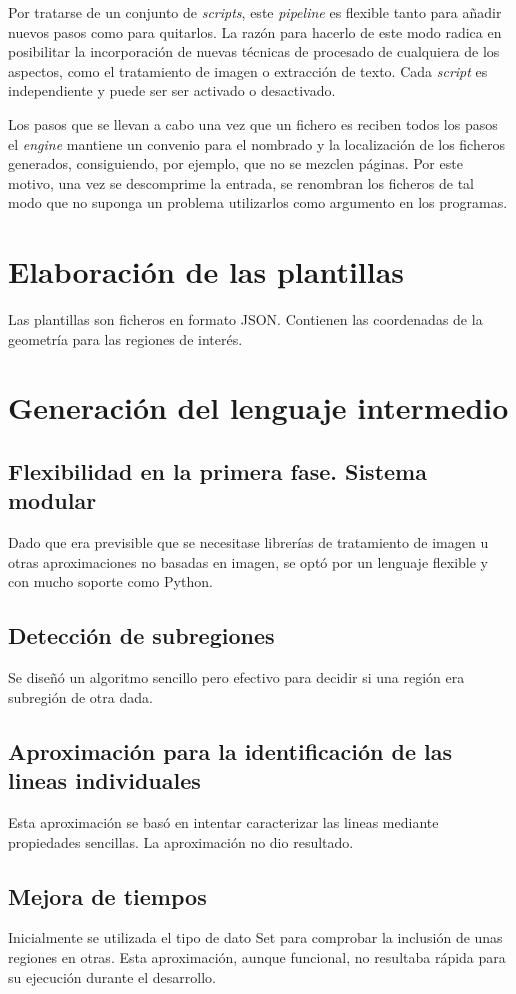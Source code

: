 Por tratarse de un conjunto de \emph{scripts}, este \emph{pipeline} es flexible tanto para añadir nuevos pasos como para quitarlos. La razón para hacerlo de este modo radica en posibilitar la incorporación de nuevas técnicas de procesado de cualquiera de los aspectos, como el tratamiento de imagen o extracción de texto. Cada \emph{script} es independiente y puede ser ser activado o desactivado.


Los pasos que se llevan a cabo una vez que un fichero es reciben todos los pasos el \emph{engine} mantiene un convenio para el nombrado y la localización de los ficheros generados, consiguiendo, por ejemplo, que no se mezclen páginas. Por este motivo, una vez se descomprime la entrada, se renombran los ficheros de tal modo que no suponga un problema utilizarlos como argumento en los programas.

\section{Elaboración de las plantillas}
Las plantillas son ficheros en formato JSON. Contienen las coordenadas de la geometría para las regiones de interés.
\section{Generación del lenguaje intermedio}
\subsection{Flexibilidad en la primera fase. Sistema modular}
Dado que era previsible que se necesitase librerías de tratamiento de imagen u otras aproximaciones no basadas en imagen, se optó por un lenguaje flexible y con mucho soporte como Python.
\subsection{Detección de subregiones}
Se diseñó un algoritmo sencillo pero efectivo para decidir si una región era subregión de otra dada.
\subsection{Aproximación para la identificación de las lineas individuales}
Esta aproximación se basó en intentar caracterizar las lineas mediante propiedades sencillas. La aproximación no dio resultado.
\subsection{Mejora de tiempos}
Inicialmente se utilizada el tipo de dato Set para comprobar la inclusión de unas regiones en otras. Esta aproximación, aunque funcional, no resultaba rápida para su ejecución durante el desarrollo.

